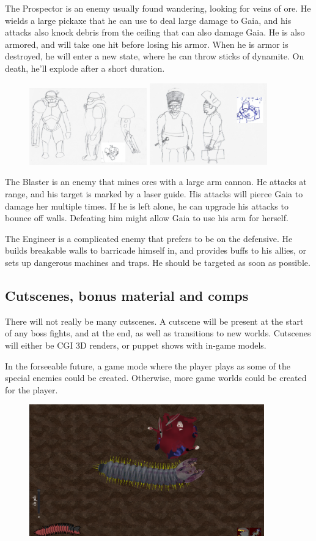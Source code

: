 \documentclass[12pt]{report}
\begin{document}
The Prospector is an enemy usually found wandering, looking for veins of ore. He wields a 
large pickaxe that he can use to deal large damage to Gaia, and his attacks also knock
debris from the ceiling that can also damage Gaia. He is also armored, and will take one
hit before losing his armor. When he is armor is destroyed, he will enter a new state, where 
he can throw sticks of dynamite. On death, he'll explode after a short duration.

\begin{figure}[ht]
    \centering
    \includegraphics[width=2in]{img/blaster.jpeg}
    \includegraphics[width=2in]{img/engi.jpeg}
\end{figure}

The Blaster is an enemy that mines ores with a large arm cannon. He attacks at range, and
his target is marked by a laser guide. His attacks will pierce Gaia to damage her multiple
times. If he is left alone, he can upgrade his attacks to bounce off walls. Defeating him
might allow Gaia to use his arm for herself.

The Engineer is a complicated enemy that prefers to be on the defensive. He builds breakable
walls to barricade himself in, and provides buffs to his allies, or sets up dangerous 
machines and traps. He should be targeted as soon as possible.

\pagebreak
\subsection*{Cutscenes, bonus material and comps}
There will not really be many cutscenes. A cutscene will be present at the start of any boss
fights, and at the end, as well as transitions to new worlds. Cutscenes will either be CGI 
3D renders, or puppet shows with in-game models. 

In the forseeable future, a game mode where the player plays as some of the special enemies 
could be created. Otherwise, more game worlds could be created for the player.

\begin{figure}[ht]
    \centering
    \includegraphics[width=4in]{img/dead_grunt.png}
\end{figure}
\end{document}
